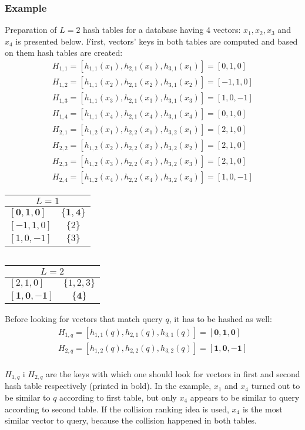 \subsubsection*{Example}
Preparation of $L = 2$ hash tables for a database having 4 vectors:
$x_1, x_2, x_3$ and $x_4$ is presented below.
First, vectors' keys in both tables are computed and based on them hash tables are created:
\begin{gather*}
H_{1,1} = [h_{1,1}(x_1), h_{2,1}(x_1), h_{3,1}(x_1)] = [0, 1, 0]\\
H_{1,2} = [h_{1,1}(x_2), h_{2,1}(x_2), h_{3,1}(x_2)] = [-1, 1, 0]\\
H_{1,3} = [h_{1,1}(x_3), h_{2,1}(x_3), h_{3,1}(x_3)] = [1, 0, -1]\\
H_{1,4} = [h_{1,1}(x_4), h_{2,1}(x_4), h_{3,1}(x_4)] = [0, 1, 0]\\
H_{2,1} = [h_{1,2}(x_1), h_{2,2}(x_1), h_{3,2}(x_1)] = [2, 1, 0]\\
H_{2,2} = [h_{1,2}(x_2), h_{2,2}(x_2), h_{3,2}(x_2)] = [2, 1, 0]\\
H_{2,3} = [h_{1,2}(x_3), h_{2,2}(x_3), h_{3,2}(x_3)] = [2, 1, 0]\\
H_{2,4} = [h_{1,2}(x_4), h_{2,2}(x_4), h_{3,2}(x_4)] = [1, 0, -1]
\end{gather*}
\renewcommand{\arraystretch}{1.2}
\begin{center}
\begin{tabular}{|l|c|}
\hline
\multicolumn{2}{|c|}{$L = 1$} \\
\hline
$\bm{[0, 1, 0]}$ & $\bm{\{1, 4\}}$ \\
\hline
$[-1, 1, 0]$ & $\{2\}$ \\
\hline
$[1, 0, -1]$ & $\{3\}$ \\
\hline
\end{tabular}
$\ \ \ \ $
\begin{tabular}{|l|c|}
\hline
\multicolumn{2}{|c|}{$L = 2$} \\
\hline
$[2, 1, 0]$ & $\{1, 2, 3\}$ \\
\hline
$\bm{[1, 0, -1]}$ & $\bm{\{4\}}$ \\
\hline
\end{tabular}
\end{center}

Before looking for vectors that match query $q$, it has to be hashed as well:
\begin{gather*}
H_{1,q} = [h_{1,1}(q), h_{2,1}(q), h_{3,1}(q)] = \bm{[0, 1, 0]} \\
H_{2,q} = [h_{1,2}(q), h_{2,2}(q), h_{3,2}(q)] = \bm{[1, 0, -1]} \\
\end{gather*}

$H_{1,q}$ i $H_{2,q}$ are the keys with which one should look for vectors in first and second hash table respectively (printed in bold).
In the example, $x_1$ and $x_4$ turned out to be similar to $q$ according to first table, but only $x_4$ appears to be similar to query according to second table.
If the collision ranking idea is used, $x_4$ is the most similar vector to query, because the collision happened in both tables.
